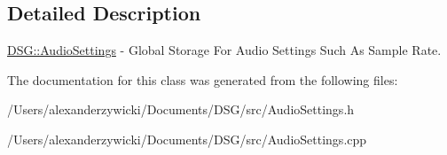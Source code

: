 \subsection{Detailed Description}
\hyperlink{class_d_s_g_1_1_audio_settings}{D\+S\+G\+::\+Audio\+Settings} -\/ Global Storage For Audio Settings Such As Sample Rate. 

The documentation for this class was generated from the following files\+:\begin{DoxyCompactItemize}
\item 
/\+Users/alexanderzywicki/\+Documents/\+D\+S\+G/src/Audio\+Settings.\+h\item 
/\+Users/alexanderzywicki/\+Documents/\+D\+S\+G/src/Audio\+Settings.\+cpp\end{DoxyCompactItemize}
